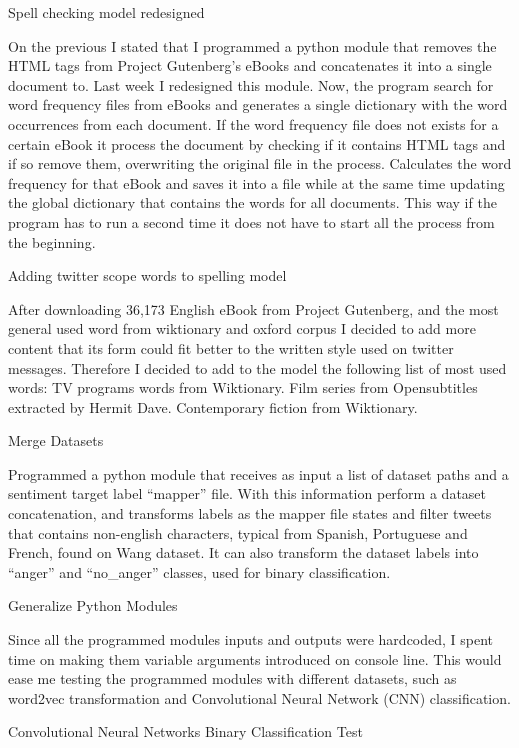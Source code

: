 Spell checking model redesigned

On the previous I stated that I programmed a python module that removes the HTML tags from Project Gutenberg's eBooks and concatenates it into a single document to. Last week I redesigned this module.
Now, the program search for word frequency files from eBooks and generates a single dictionary with the word occurrences from each document.
If the word frequency file does not exists for a certain eBook it process the document by checking if it contains HTML tags and if so remove them, overwriting the original file in the process.
Calculates the word frequency for that eBook and saves it into a file while at the same time updating the global dictionary that contains the words for all documents.
This way if the program has to run a second time it does not have to start all the process from the beginning.

Adding twitter scope words to spelling model

After downloading 36,173 English eBook from Project Gutenberg\cite{projectGutenberg}, and the most general used word from wiktionary and oxford corpus I decided to add more content that its form could fit better to the written style used on twitter messages. Therefore I decided to add to the model the following list of most used words:
TV programs words from Wiktionary.
Film series from Opensubtitles extracted by Hermit Dave\cite{openSubtitlesFL}.
Contemporary fiction from Wiktionary.

Merge Datasets

Programmed a python module that receives as input a list of dataset paths and a sentiment target label “mapper” file. 
With this information perform a dataset concatenation, and transforms labels as the mapper file states and filter tweets that contains non-english characters, typical from Spanish, Portuguese and French, found on Wang dataset.
It can also transform the dataset labels into “anger” and “no\_anger” classes, used for binary classification.

Generalize Python Modules

Since all the programmed modules inputs and outputs were hardcoded, I spent time on making them variable arguments introduced on console line.
This would ease me testing the programmed modules with different datasets, such as word2vec transformation and Convolutional Neural Network (CNN) classification.

Convolutional Neural Networks Binary Classification Test

